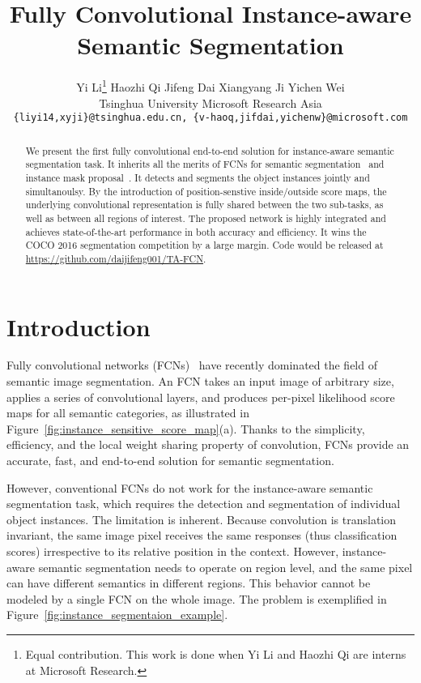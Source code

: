 \documentclass[10pt,twocolumn,letterpaper]{article}
\begin{document}
\title{Fully Convolutional Instance-aware Semantic Segmentation}

\author{Yi Li\thanks{Equal contribution. This work is done when Yi Li and Haozhi Qi are interns at Microsoft Research.} \qquad Haozhi Qi \qquad Jifeng Dai \qquad Xiangyang Ji \qquad Yichen Wei\\
Tsinghua University \qquad \qquad \qquad Microsoft Research Asia \quad\quad\quad\quad\quad\quad\\
{\tt\small \{liyi14,xyji\}@tsinghua.edu.cn, \{v-haoq,jifdai,yichenw\}@microsoft.com}
}

\maketitle


\begin{abstract}
We present the first fully convolutional end-to-end solution for instance-aware semantic segmentation task. It inherits all the merits of FCNs for semantic segmentation~\cite{long2015fully} and instance mask proposal~\cite{dai2016instance}. It detects and segments the object instances jointly and simultanoulsy. By the introduction of position-senstive inside/outside score maps, the underlying convolutional representation is fully shared between the two sub-tasks, as well as between all regions of interest. The proposed network is highly integrated and achieves state-of-the-art performance in both accuracy and efficiency. It wins the COCO 2016 segmentation competition by a large margin. Code would be released at \url{https://github.com/daijifeng001/TA-FCN}.

\end{abstract}

\section{Introduction}
\label{sec.intro}
Fully convolutional networks (FCNs)~\cite{long2015fully} have recently dominated the field of semantic image segmentation. An FCN takes an input image of arbitrary size, applies a series of convolutional layers, and produces per-pixel likelihood score maps for all semantic categories, as illustrated in Figure~\ref{fig:instance_sensitive_score_map}(a). Thanks to the simplicity, efficiency, and the local weight sharing property of convolution, FCNs provide an accurate, fast, and end-to-end solution for semantic segmentation.

However, conventional FCNs do not work for the instance-aware semantic segmentation task, which requires the detection and segmentation of individual object instances. The limitation is inherent. Because convolution is translation invariant, the same image pixel receives the same responses (thus classification scores) irrespective to its relative position in the context. However, instance-aware semantic segmentation needs to operate on region level, and the same pixel can have different semantics in different regions. This behavior cannot be modeled by a single FCN on the whole image. The problem is exemplified in Figure~\ref{fig:instance_segmentaion_example}.
\end{document}
